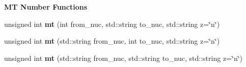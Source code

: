 \begin{Indent}{\bf MT Number Functions}
\begin{DoxyCompactItemize}
\item 
unsigned int {\bfseries mt} (int from\+\_\+nuc, std\+::string to\+\_\+nuc, std\+::string z=\char`\"{}n\char`\"{})\hypertarget{namespacepyne_1_1rxname_ae60365d15decfc47d1a5347c51539044}{}\label{namespacepyne_1_1rxname_ae60365d15decfc47d1a5347c51539044}

\item 
unsigned int {\bfseries mt} (std\+::string from\+\_\+nuc, int to\+\_\+nuc, std\+::string z=\char`\"{}n\char`\"{})\hypertarget{namespacepyne_1_1rxname_a0ec75a7a63fd4fd12fc532e6709d15ce}{}\label{namespacepyne_1_1rxname_a0ec75a7a63fd4fd12fc532e6709d15ce}

\item 
unsigned int {\bfseries mt} (std\+::string from\+\_\+nuc, std\+::string to\+\_\+nuc, std\+::string z=\char`\"{}n\char`\"{})\hypertarget{namespacepyne_1_1rxname_af154ac0682fcad310e2ce7dd91174438}{}\label{namespacepyne_1_1rxname_af154ac0682fcad310e2ce7dd91174438}

\end{DoxyCompactItemize}
\end{Indent}
